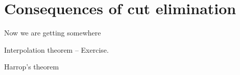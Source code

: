 %
\chapter{Consequences of cut elimination}
\label{c-ce-conseq}
%
Now we are getting somewhere

\bigskip

Interpolation theorem -- Exercise.

Harrop's theorem